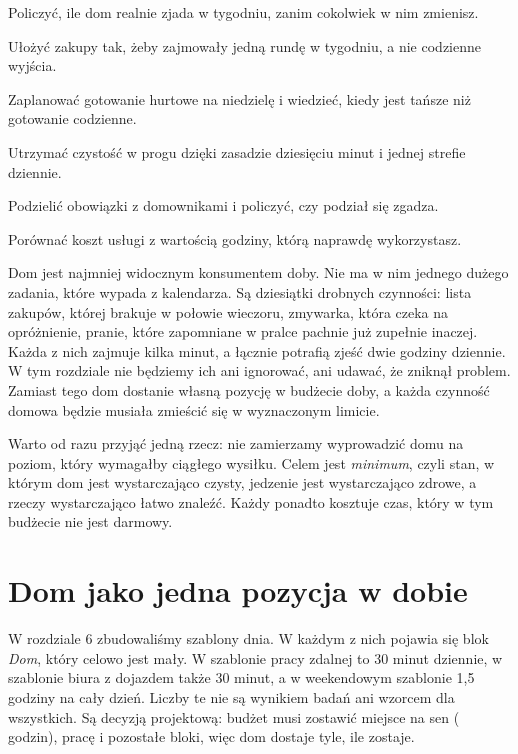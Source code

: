 
\begin{cele}
  \item Policzyć, ile dom realnie zjada w tygodniu, zanim cokolwiek w nim zmienisz.
  \item Ułożyć zakupy tak, żeby zajmowały jedną rundę w tygodniu, a nie codzienne wyjścia.
  \item Zaplanować gotowanie hurtowe na niedzielę i wiedzieć, kiedy jest tańsze niż gotowanie codzienne.
  \item Utrzymać czystość w progu dzięki zasadzie dziesięciu minut i jednej strefie dziennie.
  \item Podzielić obowiązki z domownikami i policzyć, czy podział się zgadza.
  \item Porównać koszt usługi z wartością godziny, którą naprawdę wykorzystasz.
\end{cele}

Dom jest najmniej widocznym konsumentem doby. Nie ma w nim jednego dużego
zadania, które wypada z kalendarza. Są dziesiątki drobnych czynności: lista
zakupów, której brakuje w połowie wieczoru, zmywarka, która czeka na
opróżnienie, pranie, które zapomniane w pralce pachnie już zupełnie
inaczej. Każda z nich zajmuje kilka minut, a łącznie potrafią zjeść dwie
godziny dziennie. W tym rozdziale nie będziemy ich ani ignorować, ani
udawać, że zniknął problem. Zamiast tego dom dostanie własną pozycję w
budżecie doby, a każda czynność domowa będzie musiała zmieścić się w
wyznaczonym limicie.

Warto od razu przyjąć jedną rzecz: nie zamierzamy wyprowadzić domu na
poziom, który wymagałby ciągłego wysiłku. Celem jest \emph{minimum}, czyli
stan, w którym dom jest wystarczająco czysty, jedzenie jest wystarczająco
zdrowe, a rzeczy wystarczająco łatwo znaleźć. Każdy ponadto kosztuje czas,
który w tym budżecie nie jest darmowy.

\section{Dom jako jedna pozycja w dobie}

W rozdziale 6 zbudowaliśmy szablony dnia. W każdym z nich pojawia się
blok \emph{Dom}, który celowo jest mały. W szablonie pracy zdalnej to
30 minut dziennie, w szablonie biura z dojazdem także 30 minut, a w
weekendowym szablonie 1,5 godziny na cały dzień. Liczby te nie są
wynikiem badań ani wzorcem dla wszystkich. Są decyzją projektową: budżet
musi zostawić miejsce na sen ( godzin), pracę i
pozostałe bloki, więc dom dostaje tyle, ile zostaje.

